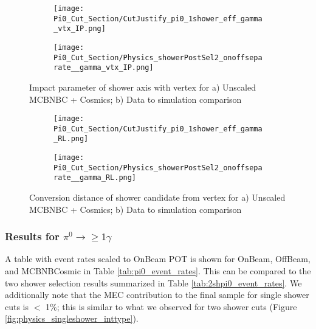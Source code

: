 \begin{figure}[t!]
\centering
  \begin{subfigure}[t]{0.35\textwidth}
    \centering
\texttt{[image: Pi0\_Cut\_Section/CutJustify\_pi0\_1shower\_eff\_gamma\_vtx\_IP.png]}
  \caption{ }
  \end{subfigure} 
  \hspace{30mm}
  \begin{subfigure}[t]{0.35\textwidth}
    \centering
\texttt{[image: Pi0\_Cut\_Section/Physics\_showerPostSel2\_onoffseparate\_\_gamma\_vtx\_IP.png]}
  \caption{ }
  \end{subfigure} 
\caption{ Impact parameter of shower axis with vertex for a) Unscaled MCBNBC + Cosmics; b) Data to simulation comparison }
\label{fig:cutjust_pi0_1shower_IP}
\end{figure}

\begin{figure}[h!]
\centering
  \begin{subfigure}[t]{0.35\textwidth}
    \centering
\texttt{[image: Pi0\_Cut\_Section/CutJustify\_pi0\_1shower\_eff\_gamma\_RL.png]}
  \caption{ }
  \end{subfigure} 
  \hspace{30mm}
  \begin{subfigure}[t]{0.35\textwidth}
    \centering
\texttt{[image: Pi0\_Cut\_Section/Physics\_showerPostSel2\_onoffseparate\_\_gamma\_RL.png]}
  \caption{ }
  \end{subfigure} 
\caption{ Conversion distance of shower candidate from vertex for a) Unscaled MCBNBC + Cosmics; b) Data to simulation comparison }
\label{fig:cutjust_pi0_1shower_RL}
\end{figure}

\subsubsection{Results for $\pi^0\rightarrow \geq 1\gamma$}
\par A table with event rates scaled to OnBeam POT is shown for OnBeam, OffBeam, and MCBNBCosmic in Table \ref{tab:pi0_event_rates}. This can be compared to the two shower selection results summarized in Table \ref{tab:2shpi0_event_rates}.  We additionally note that the MEC contribution to the final sample for single shower cuts is $<$ 1\%; this is similar to what we observed for two shower cuts (Figure \ref{fig:physics_singleshower_inttype}). %

